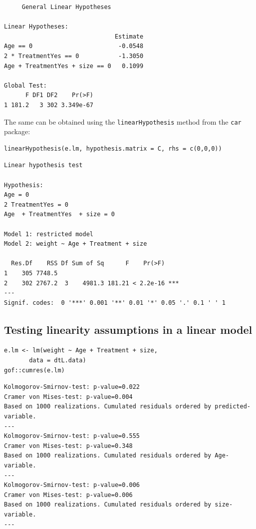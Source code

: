 \documentclass{article}
\begin{document}
\begin{verbatim}
	 General Linear Hypotheses

Linear Hypotheses:
                               Estimate
Age == 0                        -0.0548
2 * TreatmentYes == 0           -1.3050
Age + TreatmentYes + size == 0   0.1099

Global Test:
      F DF1 DF2    Pr(>F)
1 181.2   3 302 3.349e-67
\end{verbatim}

The same can be obtained using the \texttt{linearHypothesis} method from the \texttt{car} package:
\lstset{language=r,label= ,caption= ,captionpos=b,numbers=none}
\begin{lstlisting}
linearHypothesis(e.lm, hypothesis.matrix = C, rhs = c(0,0,0))
\end{lstlisting}

\begin{verbatim}
Linear hypothesis test

Hypothesis:
Age = 0
2 TreatmentYes = 0
Age  + TreatmentYes  + size = 0

Model 1: restricted model
Model 2: weight ~ Age + Treatment + size

  Res.Df    RSS Df Sum of Sq      F    Pr(>F)    
1    305 7748.5                                  
2    302 2767.2  3    4981.3 181.21 < 2.2e-16 ***
---
Signif. codes:  0 '***' 0.001 '**' 0.01 '*' 0.05 '.' 0.1 ' ' 1
\end{verbatim}

\subsection{Testing linearity assumptions in a linear model}
\label{sec:org6da5bb9}
\lstset{language=r,label= ,caption= ,captionpos=b,numbers=none}
\begin{lstlisting}
e.lm <- lm(weight ~ Age + Treatment + size,
	   data = dtL.data)
gof::cumres(e.lm)
\end{lstlisting}

\begin{verbatim}
Kolmogorov-Smirnov-test: p-value=0.022
Cramer von Mises-test: p-value=0.004
Based on 1000 realizations. Cumulated residuals ordered by predicted-variable.
---
Kolmogorov-Smirnov-test: p-value=0.555
Cramer von Mises-test: p-value=0.348
Based on 1000 realizations. Cumulated residuals ordered by Age-variable.
---
Kolmogorov-Smirnov-test: p-value=0.006
Cramer von Mises-test: p-value=0.006
Based on 1000 realizations. Cumulated residuals ordered by size-variable.
---
\end{verbatim}
\end{document}
